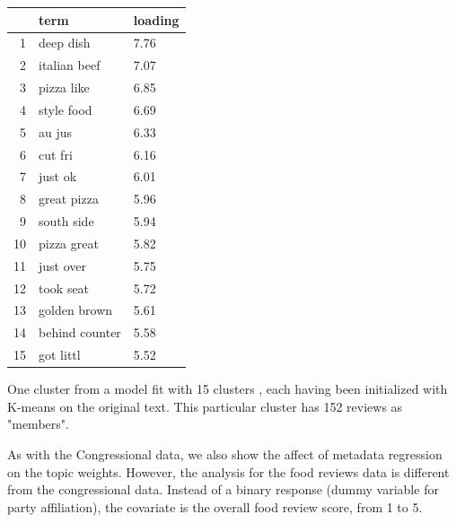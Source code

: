 \documentclass[12pt]{article}
\begin{document}
\begin{table}[ht]
\centering
\begin{threeparttable}
\begin{tabular}{rll}
  \hline
 & term & loading \\ 
  \hline
1 & deep dish & 7.76 \\ 
  2 & italian beef & 7.07 \\ 
  3 & pizza like & 6.85 \\ 
  4 & style food & 6.69 \\ 
  5 & au jus & 6.33 \\ 
  6 & cut fri & 6.16 \\ 
  7 & just ok & 6.01 \\ 
  8 & great pizza & 5.96 \\ 
  9 & south side & 5.94 \\ 
  10 & pizza great & 5.82 \\ 
  11 & just over & 5.75 \\ 
  12 & took seat & 5.72 \\ 
  13 & golden brown & 5.61 \\ 
  14 & behind counter & 5.58 \\ 
  15 & got littl & 5.52 \\ 
   \hline
\end{tabular}
\begin{tablenotes}
\small
\item One cluster from a model fit with 15 clusters , each having been initialized with K-means on the original text. This particular cluster has 152 reviews as "members".
\end{tablenotes}
\end{threeparttable}
\end{table}


As with the Congressional data, we also show the affect of metadata regression on the topic weights. However, the analysis for the food reviews data is different from the congressional data. Instead of a binary response (dummy variable for party affiliation), the covariate is the overall food review score, from 1 to 5.
\end{document}
